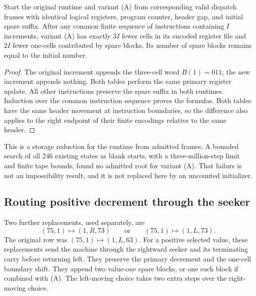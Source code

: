 \begin{corollary}
Start the original runtime and variant \textup{(A)} from corresponding
valid dispatch frames with identical logical registers, program counter,
header gap, and initial spare suffix.  After any common finite sequence
of instructions containing $I$ increments, variant \textup{(A)} has
exactly $3I$ fewer cells in its encoded register file and $2I$ fewer
one-cells contributed by spare blocks.  Its number of spare blocks
remains equal to the initial number.
\end{corollary}
\begin{proof}
The original increment appends the three-cell word $B(1)=011$; the
new increment appends nothing.  Both tables perform the same primary
register update.  All other instructions preserve the spare suffix
in both runtimes.  Induction over the common instruction sequence
proves the formulas.  Both tables have the same header movement at
instruction boundaries, so the difference also applies to the right
endpoint of their finite encodings relative to the same header.
\end{proof}

This is a storage reduction for the runtime from admitted frames.
A bounded search of all 246 existing states as blank starts, with a
three-million-step limit and finite tape bounds, found no admitted
root for variant \textup{(A)}.  That failure is not an impossibility
result, and it is not replaced here by an uncounted initializer.

\subsection{Routing positive decrement through the seeker}

Two further replacements, used separately, are
\[
 (75,1)\mapsto(1,R,73)\qquad\text{or}\qquad
 (75,1)\mapsto(1,L,73).
 \tag{B$_R$, B$_L$}
\]
The original row was $(75,1)\mapsto(1,L,63)$.  For a positive
selected value, these replacements send the machine through the
rightward seeker and its terminating carry before returning left.
They preserve the primary decrement and the one-cell boundary shift.
They append two value-one spare blocks, or one such block if combined
with \textup{(A)}.  The left-moving choice takes two extra steps over
the right-moving choice.

